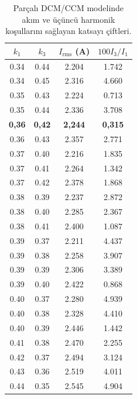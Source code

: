 \begin{table}[H]
  \centering
  \caption{Parçalı DCM/CCM modelinde akım ve üçüncü harmonik koşullarını sağlayan katsayı çiftleri.}
  \label{tab:sin3-katsayi-kombinasyonlari}
  \normalsize
  \setlength{\tabcolsep}{12bp}
  \renewcommand{\arraystretch}{1.15}
  \begin{tabular}{cccc}
    \toprule
    $k_1$ & $k_3$ & $I_{\mathrm{rms}}$ (A) & $100I_3/I_1$ \\
    \midrule
    \num{0.34} & \num{0.44} & \num{2.204} & \num{1.742} \\
    \num{0.34} & \num{0.45} & \num{2.316} & \num{4.660} \\
    \num{0.35} & \num{0.43} & \num{2.224} & \num{0.713} \\
    \num{0.35} & \num{0.44} & \num{2.336} & \num{3.708} \\
    \textbf{0,36} & \textbf{0,42} & \textbf{2,244} & \textbf{0,315} \\
    \num{0.36} & \num{0.43} & \num{2.357} & \num{2.771} \\
    \num{0.37} & \num{0.40} & \num{2.216} & \num{1.835} \\
    \num{0.37} & \num{0.41} & \num{2.264} & \num{1.342} \\
    \num{0.37} & \num{0.42} & \num{2.378} & \num{1.868} \\
    \num{0.38} & \num{0.39} & \num{2.237} & \num{2.872} \\
    \num{0.38} & \num{0.40} & \num{2.285} & \num{2.367} \\
    \num{0.38} & \num{0.41} & \num{2.400} & \num{1.087} \\
    \num{0.39} & \num{0.37} & \num{2.211} & \num{4.437} \\
    \num{0.39} & \num{0.38} & \num{2.258} & \num{3.907} \\
    \num{0.39} & \num{0.39} & \num{2.306} & \num{3.389} \\
    \num{0.39} & \num{0.40} & \num{2.422} & \num{0.868} \\
    \num{0.40} & \num{0.37} & \num{2.280} & \num{4.939} \\
    \num{0.40} & \num{0.38} & \num{2.328} & \num{4.410} \\
    \num{0.40} & \num{0.39} & \num{2.446} & \num{1.442} \\
    \num{0.41} & \num{0.38} & \num{2.470} & \num{2.255} \\
    \num{0.42} & \num{0.37} & \num{2.494} & \num{3.124} \\
    \num{0.43} & \num{0.36} & \num{2.519} & \num{4.011} \\
    \num{0.44} & \num{0.35} & \num{2.545} & \num{4.904} \\
    \bottomrule
  \end{tabular}
\end{table}


